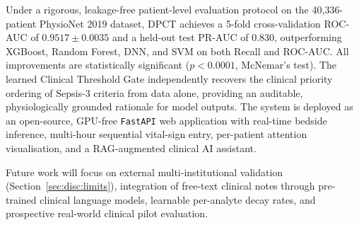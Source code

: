 \documentclass[conference,12pt]{IEEEtran}
\newcommand{\dpct}{\textsc{DPCT}}
\newcommand{\sect}[1]{Section~\ref{#1}}
\begin{document}
Under a rigorous, leakage-free patient-level evaluation protocol on the
40,336-patient PhysioNet 2019 dataset, \dpct{} achieves a 5-fold
cross-validation ROC-AUC of $0.9517 \pm 0.0035$ and a held-out test PR-AUC
of 0.830, outperforming XGBoost, Random Forest, DNN, and SVM on both Recall
and ROC-AUC.
All improvements are statistically significant ($p < 0.0001$, McNemar's test).
The learned Clinical Threshold Gate independently recovers the clinical priority
ordering of Sepsis-3 criteria from data alone, providing an auditable,
physiologically grounded rationale for model outputs.
The system is deployed as an open-source, GPU-free \texttt{FastAPI} web
application with real-time bedside inference, multi-hour sequential vital-sign
entry, per-patient attention visualisation, and a RAG-augmented clinical AI
assistant.

Future work will focus on external multi-institutional validation
(\sect{sec:disc:limits}), integration of free-text clinical notes through
pre-trained clinical language models, learnable per-analyte decay rates, and
prospective real-world clinical pilot evaluation.

\balance
\end{document}
